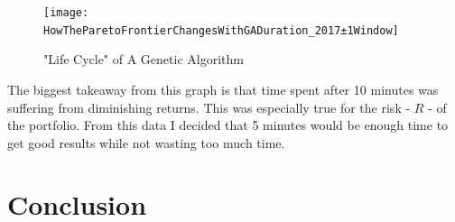 \documentclass[11pt]{article}
\begin{document}
    \begin{figure}[h] %
        \centering
        \texttt{[image: HowTheParetoFrontierChangesWithGADuration\_2017±1Window]}
        \caption{"Life Cycle" of A Genetic Algorithm}
            \label{fig:HowTheParetoFrontierChangesWithGADuration_2017±1Window}
    \end{figure}

    The biggest takeaway from this graph is that time spent after 10 minutes was suffering
    from diminishing returns. This was especially true for the risk - \(R\) - of the
    portfolio. From this data I decided that 5 minutes would be enough time to
    get good results while not wasting too much time.

\section{Conclusion}

\pagebreak


\end{document}
